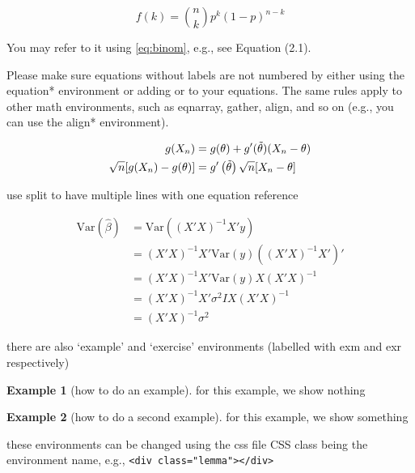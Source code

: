 \documentclass[
]{book}
\theoremstyle{definition}
\theoremstyle{definition}
\newtheorem{example}{Example}[chapter]
\theoremstyle{definition}
\theoremstyle{remark}
\begin{document}
\begin{equation} 
  f\left(k\right) = \binom{n}{k} p^k\left(1-p\right)^{n-k}
  \label{eq:binom}
\end{equation}

You may refer to it using \eqref{eq:binom}, e.g., see Equation (2.1).

Please make sure equations  without labels are not numbered by either using the equation* environment or adding \nonumber or \notag to your equations. The same rules apply to other math environments, such as eqnarray, gather, align, and so on (e.g., you can use the align* environment).

\begin{align} 
g(X_{n}) & = g(\theta)+g'({\tilde{\theta}})(X_{n}-\theta) \notag \\
\sqrt{n}[g(X_{n})-g(\theta)] & = g'\left({\tilde{\theta}}\right) 
\sqrt{n}[X_{n}-\theta]\label{eq:align} \\
\end{align}

use split to have multiple lines with one equation reference

\begin{equation} 
\begin{split}
\mathrm{Var}(\hat{\beta}) & =\mathrm{Var}((X'X)^{-1}X'y)\\
 & =(X'X)^{-1}X'\mathrm{Var}(y)((X'X)^{-1}X')'\\
 & =(X'X)^{-1}X'\mathrm{Var}(y)X(X'X)^{-1}\\
 & =(X'X)^{-1}X'\sigma^{2}IX(X'X)^{-1}\\
 & =(X'X)^{-1}\sigma^{2}
\end{split}
\label{eq:var-beta}
\end{equation}

there are also `example' and `exercise' environments (labelled with exm and exr respectively)

\begin{example}[how to do an example]
\protect\hypertarget{exm:eg1}{}{\label{exm:eg1} \iffalse (how to do an example) \fi{} }for this example, we show nothing
\end{example}

\begin{example}[how to do a second example]
\protect\hypertarget{exm:eg2}{}{\label{exm:eg2} \iffalse (how to do a second example) \fi{} }for this example, we show something
\end{example}

these environments can be changed using the css file
CSS class being the environment name, e.g., \texttt{\textless{}div\ class="lemma"\textgreater{}\textless{}/div\textgreater{}}
\end{document}
